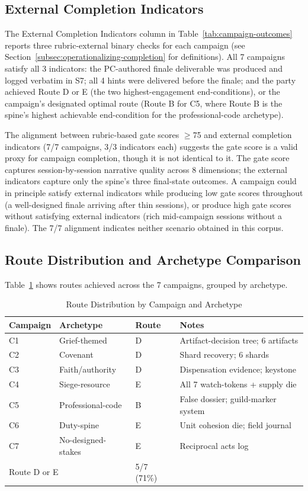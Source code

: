 \subsection{External Completion Indicators}

The External Completion Indicators column in Table~\ref{tab:campaign-outcomes}
reports three rubric-external binary checks for each campaign (see
Section~\ref{subsec:operationalizing-completion} for definitions). All 7 campaigns
satisfy all 3 indicators: the PC-authored finale deliverable was produced and logged
verbatim in S7; all 4 hints were delivered before the finale; and the party achieved
Route D or E (the two highest-engagement end-conditions), or the campaign's designated
optimal route (Route B for C5, where Route B is the spine's highest achievable
end-condition for the professional-code archetype).

The alignment between rubric-based gate scores $\geq$75 and external completion
indicators (7/7 campaigns, 3/3 indicators each) suggests the gate score is a valid
proxy for campaign completion, though it is not identical to it. The gate score
captures session-by-session narrative quality across 8 dimensions; the external
indicators capture only the spine's three final-state outcomes. A campaign could
in principle satisfy external indicators while producing low gate scores throughout
(a well-designed finale arriving after thin sessions), or produce high gate scores
without satisfying external indicators (rich mid-campaign sessions without a finale).
The 7/7 alignment indicates neither scenario obtained in this corpus.

\subsection{Route Distribution and Archetype Comparison}

Table~\ref{tab:route-distribution} shows routes achieved across the 7 campaigns,
grouped by archetype.

\begin{table}[t]
\caption{Route Distribution by Campaign and Archetype}
\label{tab:route-distribution}
\begin{tabular}{@{}lllp{3.2cm}@{}}
\toprule
Campaign & Archetype & Route & Notes \\
\midrule
C1 & Grief-themed & D & Artifact-decision tree; 6 artifacts \\
C2 & Covenant & D & Shard recovery; 6 shards \\
C3 & Faith/authority & D & Dispensation evidence; keystone \\
C4 & Siege-resource & E & All 7 watch-tokens + supply die \\
C5 & Professional-code & B & False dossier; guild-marker system \\
C6 & Duty-spine & E & Unit cohesion die; field journal \\
C7 & No-designed-stakes & E & Reciprocal acts log \\
\midrule
\multicolumn{2}{l}{Route D or E} & 5/7 (71\%) & \\
\bottomrule
\end{tabular}
\end{table}

